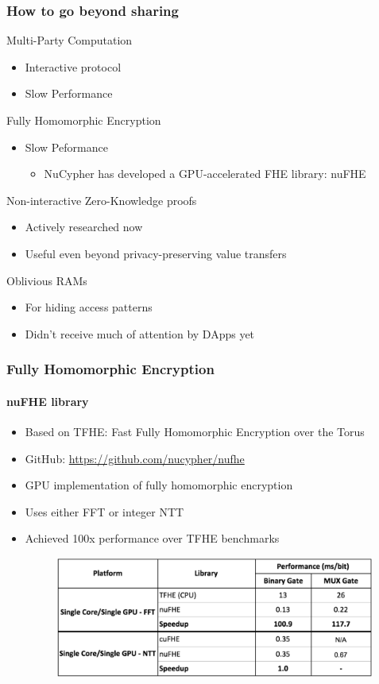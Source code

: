 \documentclass[xetex,mathsans,sans,aspectratio=169]{beamer}
\begin{document}
    \begin{frame}
        \frametitle{How to go beyond sharing}
        Multi-Party Computation
        \begin{itemize}
           \item Interactive protocol
           \item Slow Performance
        \end{itemize}

        Fully Homomorphic Encryption
        \begin{itemize}
           \item Slow Peformance
           \begin{itemize}
               \item NuCypher has developed a GPU-accelerated FHE library: nuFHE
           \end{itemize}
        \end{itemize}

        Non-interactive Zero-Knowledge proofs
        \begin{itemize}
            \item Actively researched now
            \item Useful even beyond privacy-preserving value transfers
        \end{itemize}

        Oblivious RAMs
        \begin{itemize}
            \item For hiding access patterns
            \item Didn't receive much of attention by DApps yet
        \end{itemize}
    \end{frame}

    \begin{frame}
      \frametitle{Fully Homomorphic Encryption}
       \framesubtitle{nuFHE library}
       \begin{itemize}
           \item Based on TFHE: Fast Fully Homomorphic Encryption over the Torus
           \item GitHub: \url{https://github.com/nucypher/nufhe}
           \item GPU implementation of fully homomorphic encryption
           \item Uses either FFT or integer NTT
           \item Achieved 100x performance over TFHE benchmarks
           \begin{figure}
               \includegraphics[width=10.5cm]{pdf/nufhe-benchmarks.pdf}
           \end{figure}
       \end{itemize}
     \end{frame}
\end{document}

